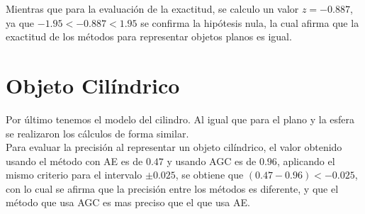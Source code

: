 Mientras que para la evaluación de la exactitud, se calculo un valor $z=-0.887$, ya que $-1.95<-0.887<1.95$ se confirma la hipótesis nula, la cual afirma que la exactitud de los métodos para representar objetos planos es igual.


%
%
%
%
%
%
%



\section{Objeto Cilíndrico}

Por último tenemos el modelo del \gls{cilindro}. Al igual que para el plano y la esfera se realizaron los cálculos de forma similar.\\

Para evaluar la precisión al representar un objeto cilíndrico, el valor obtenido  usando el método con AE es de $0.47$ y usando AGC es de $0.96$, aplicando el mismo criterio para el intervalo $\pm 0.025$, se obtiene que $(0.47-0.96)<-0.025$, con lo cual se afirma que la precisión entre los métodos es diferente, y que el método que usa AGC es mas preciso que el que usa AE.\\

